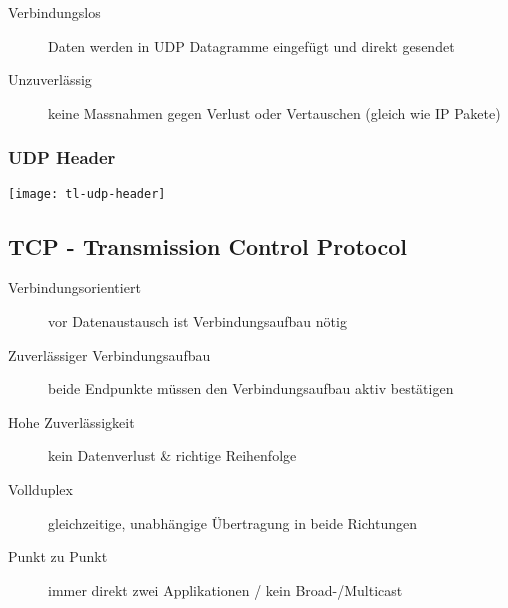 \begin{description}
	\item[Verbindungslos] Daten werden in UDP Datagramme eingefügt und direkt gesendet
	\item[Unzuverlässig] keine Massnahmen gegen Verlust oder Vertauschen
		(gleich wie IP Pakete)
\end{description}

\subsubsection{UDP Header}
\begin{center}
	\texttt{[image: tl-udp-header]}
\end{center}



\subsection{TCP - Transmission Control Protocol}

\begin{description}
	\item[Verbindungsorientiert] vor Datenaustausch ist Verbindungsaufbau nötig
	\item[Zuverlässiger Verbindungsaufbau] beide Endpunkte müssen den Verbindungsaufbau
		aktiv bestätigen
	\item[Hohe Zuverlässigkeit] kein Datenverlust \& richtige Reihenfolge
	\item[Vollduplex] gleichzeitige, unabhängige Übertragung in beide Richtungen
	\item[Punkt zu Punkt] immer direkt zwei Applikationen / kein Broad-/Multicast
\end{description}

